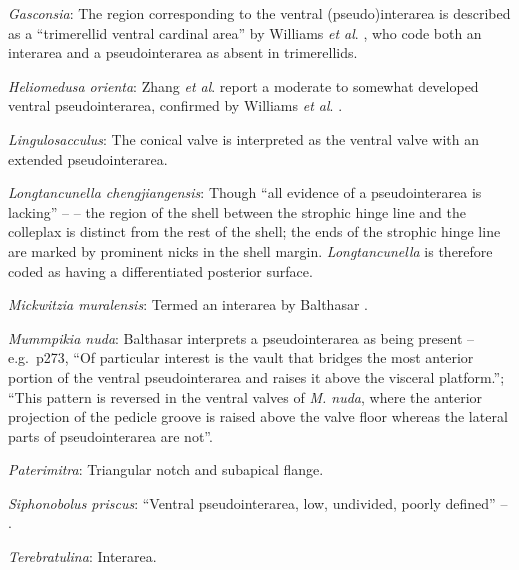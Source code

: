 \documentclass[openany]{book}
\theoremstyle{definition}
\theoremstyle{definition}
\theoremstyle{definition}
\theoremstyle{remark}
\begin{document}
\hypertarget{Gasconsia-coding-101}{}
\emph{Gasconsia}: The region corresponding to the ventral
(pseudo)interarea is described as a ``trimerellid ventral cardinal
area'' by Williams \emph{et al}.
\citeyearpar[p.162]{Williams2000LinguliformeaCraniiformea}, who code
both an interarea and a pseudointerarea as absent in trimerellids.

\hypertarget{Heliomedusa_orienta-coding-101}{}
\emph{Heliomedusa orienta}: Zhang \emph{et al}.
\citeyearpar{Zhang2009Architectureand} report a moderate to somewhat
developed ventral pseudointerarea, confirmed by Williams \emph{et al}.
\citeyearpar{Williams2007Supplement}.

\hypertarget{Lingulosacculus-coding-101}{}
\emph{Lingulosacculus}: The conical valve is interpreted as the ventral
valve with an extended pseudointerarea.

\hypertarget{Longtancunella_chengjiangensis-coding-101}{}
\emph{Longtancunella chengjiangensis}: Though ``all evidence of a
pseudointerarea is lacking'' -- \citet{Zhang2011Theexceptionally} -- the
region of the shell between the strophic hinge line and the colleplax
\citep[fig. 2 in][]{Zhang2011Theexceptionally} is distinct from the rest
of the shell; the ends of the strophic hinge line are marked by
prominent nicks in the shell margin. \emph{Longtancunella} is therefore
coded as having a differentiated posterior surface.

\hypertarget{Mickwitzia_muralensis-coding-101}{}
\emph{Mickwitzia muralensis}: Termed an interarea by Balthasar
\citeyearpar{Balthasar2004Shellstructure}.

\hypertarget{Mummpikia_nuda-coding-101}{}
\emph{Mummpikia nuda}: Balthasar \citeyearpar{Balthasar2008iMummpikia}
interprets a pseudointerarea as being present -- e.g.~p273, ``Of
particular interest is the vault that bridges the most anterior portion
of the ventral pseudointerarea and raises it above the visceral
platform.''; ``This pattern is reversed in the ventral valves of
\emph{M. nuda}, where the anterior projection of the pedicle groove is
raised above the valve floor whereas the lateral parts of
pseudointerarea are not''.

\hypertarget{Paterimitra-coding-101}{}
\emph{Paterimitra}: Triangular notch and subapical flange.

\hypertarget{Siphonobolus_priscus-coding-101}{}
\emph{Siphonobolus priscus}: ``Ventral pseudointerarea, low, undivided,
poorly defined'' -- \citet{Williams2000LinguliformeaCraniiformea}.

\hypertarget{Terebratulina-coding-101}{}
\emph{Terebratulina}: Interarea.
\end{document}
